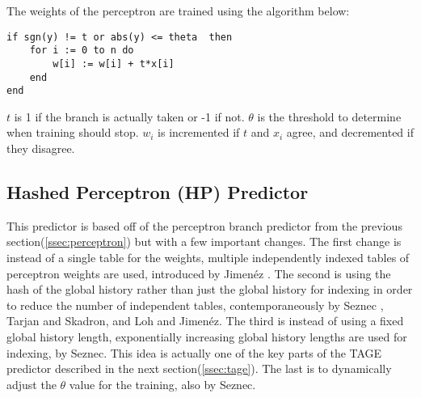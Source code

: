 \documentclass[conference]{IEEEtran}
\begin{document}
The weights of the perceptron are trained using the algorithm below:
\begin{lstlisting}
if sgn(y) != t or abs(y) <= theta  then
    for i := 0 to n do
        w[i] := w[i] + t*x[i]
    end
end
\end{lstlisting}
$t$ is 1 if the branch is actually taken or -1 if not. $\theta$ is the threshold to determine when training should stop. $w_i$ is incremented if $t$ and $x_i$ agree, and decremented if they disagree.

\subsection{Hashed Perceptron (HP) Predictor} \label{ssec:hp}
This predictor is based off of the perceptron branch predictor from the previous section(\ref{ssec:perceptron}) but with a few important changes. The first change is instead of a single table for the weights, multiple independently indexed tables of perceptron weights are used, introduced by Jimen\'ez \cite{jimenez2003}.  The second is using the hash of the global history rather than just the global history for indexing in order to reduce the number of independent tables, contemporaneously by Seznec \cite{seznec2004}, Tarjan and Skadron\cite{skadron2004}, and Loh and Jimen\'ez\cite{loh2005reducing}.  The third is instead of using a fixed global history length, exponentially increasing global history lengths are used for indexing, by Seznec\cite{seznec2004gehl}\cite{seznec2005analysis}. This idea is actually one of the key parts of the TAGE predictor described in the next section(\ref{ssec:tage}). The last is to dynamically adjust the $\theta$ value for the training, also by Seznec\cite{seznec2004gehl}\cite{seznec2005analysis}.
\end{document}
